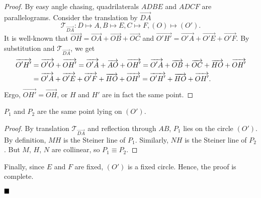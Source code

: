 \documentclass[11pt]{article}
\newenvironment{solution}[1][Solution]{%
  \proof[\normalfont \faPenNib \hspace{0.2cm} \ttfamily \scshape \large #1]%
}{\(\hfill \blacksquare\){\parfillskip0pt\par}}
\theoremstyle{definition}
\begin{document}
\begin{solution}
\begin{enumerate}
                \begin{proof}
                    By easy angle chasing, quadrilaterals \(ADBE\) and \(ADCF\) are parallelograms. Consider the translation by \(\overrightarrow{DA}\)
                    \[\mathcal{T}_{\overrightarrow{DA}}: D \mapsto A, B \mapsto E, C \mapsto F, (O) \mapsto (O').\]
                    It is well-known that \(\overrightarrow{OH} = \overrightarrow{OA} + \overrightarrow{OB} + \overrightarrow{OC}\) and \(\overrightarrow{O'H'} = \overrightarrow{O'A} + \overrightarrow{O'E} + \overrightarrow{O'F}\). By substitution and \(\mathcal{T}_{\overrightarrow{DA}}\), we get
                    \begin{equation}
                        \begin{aligned}
                            \overrightarrow{O'H'} 
                            &= \overrightarrow{O'O} + \overrightarrow{OH'} = \overrightarrow{O'A} + \overrightarrow{AO} + \overrightarrow{OH'} = \overrightarrow{O'A} + \overrightarrow{OB} + \overrightarrow{OC} + \overrightarrow{HO} + \overrightarrow{OH'} \\
                            &= \overrightarrow{O'A} + \overrightarrow{O'E} + \overrightarrow{O'F} + \overrightarrow{HO} + \overrightarrow{OH'} = \overrightarrow{O'H'} + \overrightarrow{HO} + \overrightarrow{OH'}.
                        \end{aligned}
                        \notag
                    \end{equation}
                    Ergo, \(\overrightarrow{OH'} = \overrightarrow{OH}\), or \(H\) and \(H'\) are in fact the same point.
                \end{proof}

                \begin{claim}
                    \(P_1\) and \(P_2\) are the same point lying on \((O')\).
                \end{claim}

                \begin{proof}
                    By translation \(\mathcal{T}_{\overrightarrow{DA}}\) and reflection through \(AB\), \(P_1\) lies on the circle \((O')\). By definition, \(MH\) is the Steiner line of \(P_1\). Similarly, \(NH\) is the Steiner line of \(P_2\). But \(M\), \(H\), \(N\) are collinear, so \(P_1 \equiv P_2\).
                \end{proof}

                Finally, since \(E\) and \(F\) are fixed, \((O')\) is a fixed circle. Hence, the proof is complete.
            \end{enumerate}
        \end{solution}
\end{document}
